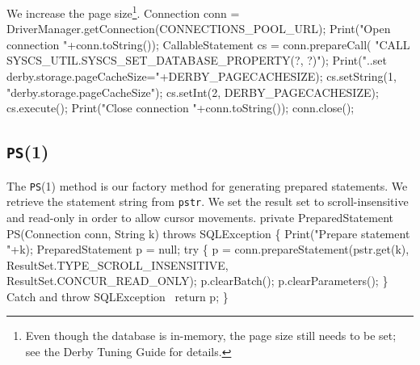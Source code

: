 \documentclass{article}
\def\nwendcode{\endtrivlist \endgroup}      %
\let\nwdocspar=\par
\theoremstyle{definition}                   %
\begin{document}
We increase the page size\footnote{Even though the database is in-memory, the
page size still needs to be set; see the Derby Tuning Guide for details.}.
\nwenddocs{}\endmoddef{}
Connection conn = DriverManager.getConnection(CONNECTIONS_POOL_URL);
Print("Open connection "+conn.toString());
CallableStatement cs = conn.prepareCall(
  "CALL SYSCS_UTIL.SYSCS_SET_DATABASE_PROPERTY(?, ?)");
Print("..set derby.storage.pageCacheSize="+DERBY_PAGECACHESIZE);
cs.setString(1, "derby.storage.pageCacheSize");
cs.setInt(2, DERBY_PAGECACHESIZE);
cs.execute();
Print("Close connection "+conn.toString());
conn.close();
\nwendcode{}\nwdocspar

\subsection{{\tt{}\protect{}PS}(1)}
The {\tt{}\protect{}PS}(1) method is our factory method for generating prepared statements.
We retrieve the statement string from {\tt{}\protect{}pstr}.  We set the result set to
scroll-insensitive and read-only in order to allow cursor movements.
\nwenddocs{}\endmoddef{}
private PreparedStatement PS(Connection conn, String k) throws SQLException \{
  Print("Prepare statement "+k);
  PreparedStatement p = null;
  try \{
    p = conn.prepareStatement(pstr.get(k),
      ResultSet.TYPE_SCROLL_INSENSITIVE, ResultSet.CONCUR_READ_ONLY);
    p.clearBatch();
    p.clearParameters();
  \}
  \LA{}Catch and throw \code{}SQLException\edoc{}~{\nwtagstyle{}}\RA{}
  return p;
\}
\eatline
{}\nwendcode{}\nwdocspar
\end{document}
